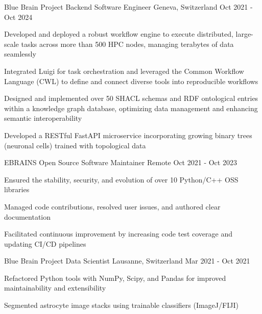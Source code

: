 \begin{cventries}
\cventry
{Blue Brain Project} %
{Backend Software Engineer} %
{Geneva, Switzerland} %
{Oct 2021 - Oct 2024} %
{ %
\begin{cvitems}
\item{Developed and deployed a robust workflow engine to execute distributed, large-scale tasks across more than 500 HPC nodes, managing terabytes of data seamlessly}
\item{Integrated Luigi for task orchestration and leveraged the Common Workflow Language (CWL) to define and connect diverse tools into reproducible workflows}
\item{Designed and implemented over 50 SHACL schemas and RDF ontological entries within a knowledge graph database, optimizing data management and enhancing semantic interoperability}
\item{Developed a RESTful FastAPI microservice incorporating growing binary trees (neuronal cells) trained with topological data}
\end{cvitems}
}

\cventry
{EBRAINS}
{Open Source Software Maintainer} %
{Remote} %
{Oct 2021 - Oct 2023} %
{ %
\begin{cvitems}
\item{Ensured the stability, security, and evolution of over 10 Python/C++ OSS libraries}
\item{Managed code contributions, resolved user issues, and authored clear documentation}
\item{Facilitated continuous improvement by increasing code test coverage and updating CI/CD pipelines}
\end{cvitems}
}



\cventry
{Blue Brain Project}
{Data Scientist} %
{Lausanne, Switzerland} %
{Mar 2021 - Oct 2021} %
{ %
\begin{cvitems}
\item{Refactored Python tools with NumPy, Scipy, and Pandas for improved maintainability and extensibility}
\item{Segmented astrocyte image stacks using trainable classifiers (ImageJ/FIJI)}
\end{cvitems}
}


\end{cventries}
